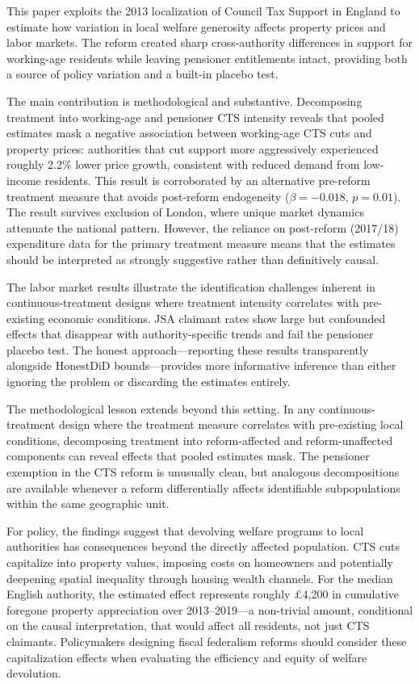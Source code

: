 \documentclass[12pt]{article}
\begin{document}
This paper exploits the 2013 localization of Council Tax Support in England to estimate how variation in local welfare generosity affects property prices and labor markets. The reform created sharp cross-authority differences in support for working-age residents while leaving pensioner entitlements intact, providing both a source of policy variation and a built-in placebo test.

The main contribution is methodological and substantive. Decomposing treatment into working-age and pensioner CTS intensity reveals that pooled estimates mask a negative association between working-age CTS cuts and property prices: authorities that cut support more aggressively experienced roughly 2.2\% lower price growth, consistent with reduced demand from low-income residents. This result is corroborated by an alternative pre-reform treatment measure that avoids post-reform endogeneity ($\beta = -0.018$, $p = 0.01$). The result survives exclusion of London, where unique market dynamics attenuate the national pattern. However, the reliance on post-reform (2017/18) expenditure data for the primary treatment measure means that the estimates should be interpreted as strongly suggestive rather than definitively causal.

The labor market results illustrate the identification challenges inherent in continuous-treatment designs where treatment intensity correlates with pre-existing economic conditions. JSA claimant rates show large but confounded effects that disappear with authority-specific trends and fail the pensioner placebo test. The honest approach---reporting these results transparently alongside HonestDiD bounds---provides more informative inference than either ignoring the problem or discarding the estimates entirely.

The methodological lesson extends beyond this setting. In any continuous-treatment design where the treatment measure correlates with pre-existing local conditions, decomposing treatment into reform-affected and reform-unaffected components can reveal effects that pooled estimates mask. The pensioner exemption in the CTS reform is unusually clean, but analogous decompositions are available whenever a reform differentially affects identifiable subpopulations within the same geographic unit.

For policy, the findings suggest that devolving welfare programs to local authorities has consequences beyond the directly affected population. CTS cuts capitalize into property values, imposing costs on homeowners and potentially deepening spatial inequality through housing wealth channels. For the median English authority, the estimated effect represents roughly \pounds4,200 in cumulative foregone property appreciation over 2013--2019---a non-trivial amount, conditional on the causal interpretation, that would affect all residents, not just CTS claimants. Policymakers designing fiscal federalism reforms should consider these capitalization effects when evaluating the efficiency and equity of welfare devolution.
\end{document}
